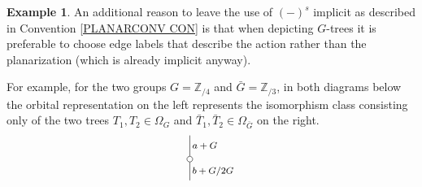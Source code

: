 \documentclass[a4paper,10pt
,draft
]{article}%
\numberwithin{equation}{section}
\numberwithin{figure}{section}
\theoremstyle{definition} %
\newtheorem{example}[equation]{Example}%
\newcommand{\1}{\ensuremath{\mathbbm 1}}%
\begin{document}
\begin{example}
An additional reason to leave the use of $(\minus)^s$ implicit
as described in Convention \ref{PLANARCONV CON} is that when depicting $G$-trees it is preferable to choose edge labels that describe the action rather than the planarization (which is already implicit anyway).

For example, for the two groups 
$G = \mathbb{Z}_{/4}$ and 
$\bar{G} = \mathbb{Z}_{/3}$, in both diagrams below the orbital representation on the left represents the isomorphism class consisting only of the two trees 
$T_1,T_2 \in \Omega_G$ and
$\bar{T}_1,\bar{T}_2 \in \Omega_{\bar{G}}$
on the right.
\[
	\begin{tikzpicture}[grow=up,auto,level distance=2.1em,
	every node/.style = {font=\footnotesize,inner sep=2pt},
	dummy/.style={circle,draw,inner sep=0pt,minimum size=1.75mm}]
%
		\node at (-1,-2) {}
			child{node [dummy] {}
				child[sibling distance=1.75em]{
				edge from parent node [swap]  {$a+G$}}
			edge from parent node [swap] {$b+G/2G$}};

\end{tikzpicture}\]
\end{example}
\end{document}
